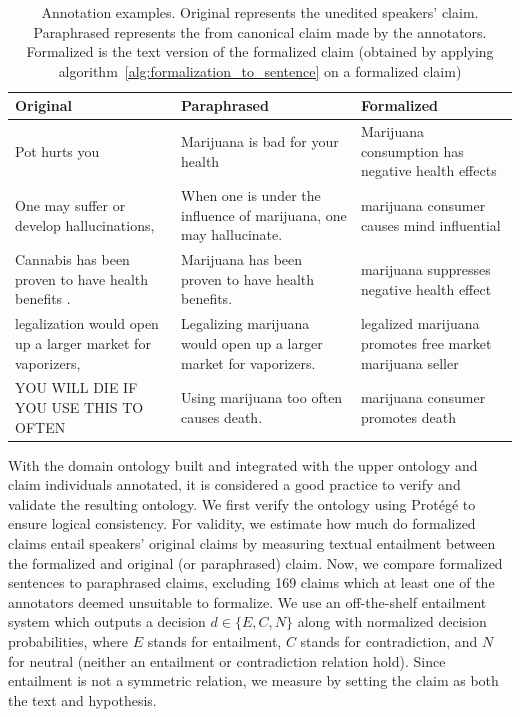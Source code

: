\begin{table}[t]
	\begin{tabular}{p{5cm}|p{5cm}|p{5cm}}
	\toprule
Original & Paraphrased & Formalized \\
\midrule
Pot hurts you & Marijuana is bad for your health & Marijuana consumption has negative health effects \\

One may suffer or develop hallucinations, &                                                                                            
When one is under the influence of marijuana, one may hallucinate. &       
marijuana consumer causes mind influential \\ 

Cannabis has been proven to have health benefits . & 
Marijuana has been proven to have health benefits. & 
marijuana suppresses negative health effect \\

legalization would open up a larger market for vaporizers, &                                                                                          
Legalizing marijuana would open up a larger market for vaporizers. &                                           
legalized marijuana promotes free market marijuana seller \\

YOU WILL DIE IF YOU USE THIS TO OFTEN &                                                                     
Using marijuana too often causes death. &                                                                                                                                                     
marijuana consumer promotes death \\                                                         
\bottomrule
\end{tabular}
\label{tab:ontology_annotation}
\caption{Annotation examples. Original represents the unedited speakers' claim.
	Paraphrased represents the from canonical claim made by the annotators.
	Formalized is the text version  of the formalized claim (obtained by
	applying algorithm~\ref{alg:formalization_to_sentence} on a formalized
	claim)
	}
\end{table}

With the domain ontology built and integrated with the upper ontology and claim
individuals annotated, it is considered a good practice to verify and validate
the resulting ontology. 
We first verify the ontology using Prot\'{e}g\'{e} to ensure logical
consistency. For validity, we estimate how much do formalized claims entail 
speakers' original claims by measuring textual entailment between the formalized
and original (or paraphrased) claim. 
Now, we compare formalized sentences to paraphrased claims, excluding 169 claims 
which at least one of the annotators deemed unsuitable to formalize. 
We use an off-the-shelf entailment system which outputs a decision $d \in \{E, C, N\}$
along with normalized decision probabilities, where $E$ stands for entailment, 
$C$ stands for contradiction, and $N$ for neutral (neither an entailment or 
contradiction relation hold). Since entailment is not a symmetric relation, we
measure by setting the claim as both the text and hypothesis. 

